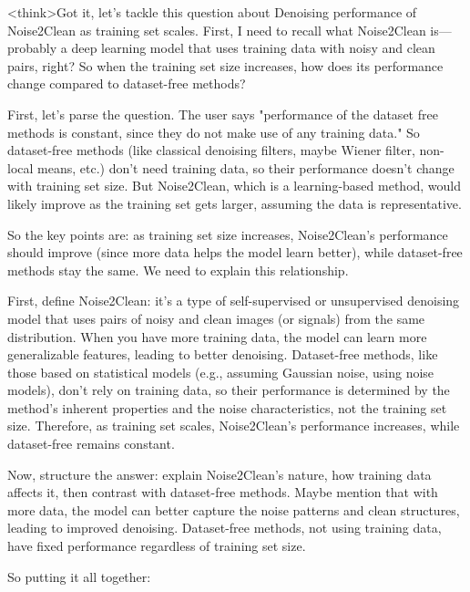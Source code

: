 <think>Got it, let's tackle this question about Denoising performance of Noise2Clean as training set scales. First, I need to recall what Noise2Clean is—probably a deep learning model that uses training data with noisy and clean pairs, right? So when the training set size increases, how does its performance change compared to dataset-free methods?

First, let's parse the question. The user says "performance of the dataset free methods is constant, since they do not make use of any training data." So dataset-free methods (like classical denoising filters, maybe Wiener filter, non-local means, etc.) don't need training data, so their performance doesn't change with training set size. But Noise2Clean, which is a learning-based method, would likely improve as the training set gets larger, assuming the data is representative. 

So the key points are: as training set size increases, Noise2Clean's performance should improve (since more data helps the model learn better), while dataset-free methods stay the same. We need to explain this relationship.

First, define Noise2Clean: it's a type of self-supervised or unsupervised denoising model that uses pairs of noisy and clean images (or signals) from the same distribution. When you have more training data, the model can learn more generalizable features, leading to better denoising. Dataset-free methods, like those based on statistical models (e.g., assuming Gaussian noise, using noise models), don't rely on training data, so their performance is determined by the method's inherent properties and the noise characteristics, not the training set size. Therefore, as training set scales, Noise2Clean's performance increases, while dataset-free remains constant.

Now, structure the answer: explain Noise2Clean's nature, how training data affects it, then contrast with dataset-free methods. Maybe mention that with more data, the model can better capture the noise patterns and clean structures, leading to improved denoising. Dataset-free methods, not using training data, have fixed performance regardless of training set size.

So putting it all together:

